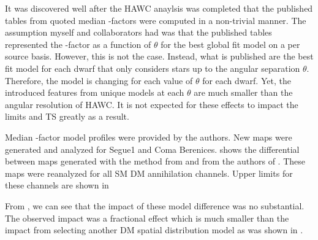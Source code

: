 It was discovered well after the HAWC anaylsis was completed that the published tables from \GS \cite{Geringer_Sameth_2015} quoted median \J-factors were computed in a non-trivial manner.
The assumption myself and collaborators had was that the published tables represented the \J-factor as a function of $\theta$ for the best global fit model on a per source basis.
However, this is not the case.
Instead, what is published are the best fit model for each dwarf that only considers stars up to the angular separation $\theta$.
Therefore, the model is changing for each value of $\theta$ for each dwarf.
Yet, the introduced features from unique models at each $\theta$ are much smaller than the angular resolution of HAWC.
It is not expected for these effects to impact the limits and TS greatly as a result.

Median \J-factor model profiles were provided by the authors.
New maps were generated and analyzed for Segue1 and Coma Berenices.
 shows the differential between maps generated with the method from  and from the authors of \cite{Geringer_Sameth_2015}.
These maps were reanalyzed for all SM DM annihilation channels.
Upper limits for these channels are shown in 

From , we can see that the impact of these model difference was no substantial.
The observed impact was a fractional effect which is much smaller than the impact from selecting another DM spatial distribution model as was shown in .

